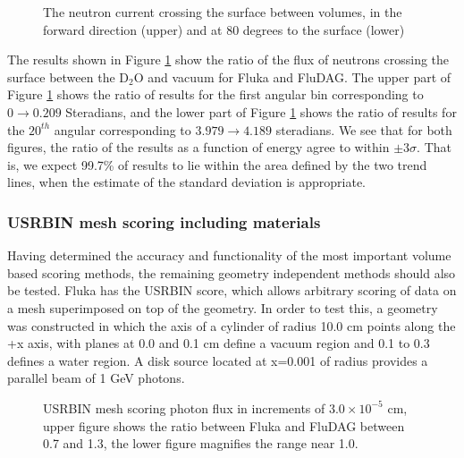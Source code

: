 \documentclass{anstrans}[11pt]
\begin{document}
\begin{figure}%
	\begin{center}
		\caption{The neutron current crossing the surface between volumes, in the 
		forward direction (upper) and at 80 degrees to the surface (lower)}
	\end{center}
\label{fig:mat_usrbdx}
\end{figure}

The results shown in Figure \ref{fig:mat_usrbdx} show the ratio of the
flux of neutrons crossing the surface between the D$_2$O and vacuum
for Fluka and FluDAG. The upper part of Figure \ref{fig:mat_usrbdx} shows
the ratio of results for the first angular bin corresponding to $0
\to 0.209$ Steradians, and the lower part of Figure \ref{fig:mat_usrbdx}
shows the ratio of results for the $20^{th}$ angular corresponding to $3.979
\to 4.189$ steradians. We see that for both figures, the ratio of the
results as a function of energy agree to within $\pm 3\sigma$. That is, we
expect 99.7\% of results to lie within the area defined by the two
trend lines, when the estimate of the standard deviation is appropriate.

\subsubsection*{USRBIN mesh scoring including materials}
Having determined the accuracy and functionality of the most important 
volume based scoring methods, the remaining geometry independent methods
should also be tested.
Fluka has the USRBIN score, which allows arbitrary scoring
of data on a mesh superimposed on top of the geometry. In order to test this, a geometry
was constructed in which the axis of a cylinder of radius 10.0 cm points along the
+x axis, with planes at 0.0 and 0.1 cm define a vacuum region and 0.1 to 0.3 
defines a water region. A disk source located at x=0.001 of radius provides a 
parallel beam of 1 GeV photons.

\begin{figure}%
	\label{fig:mesh_phot}
	\begin{center}
		\caption{USRBIN mesh scoring photon flux in increments
                  of $3.0 \times 10^{-5}$ cm, upper figure shows the ratio between
                  Fluka and FluDAG between 0.7 and 1.3, the lower
                  figure magnifies the range near 1.0. }
	\end{center}
\end{figure}
\end{document}
